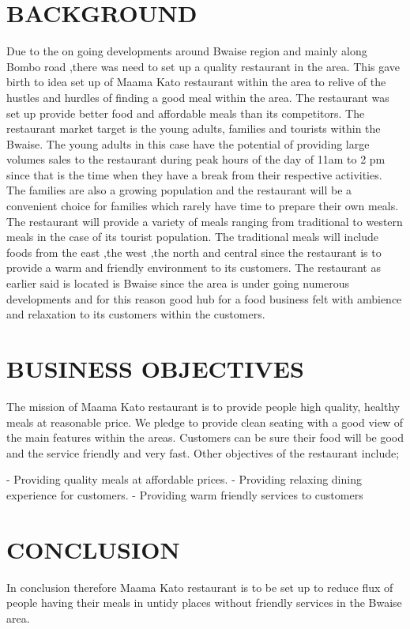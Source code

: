 \documentclass[12pt,letterpaper]{article}
\begin{document}
\section{BACKGROUND}
Due to the on going developments around Bwaise region and mainly along Bombo road ,there was need to set up a quality restaurant  in the area. This gave birth to idea set up of Maama Kato restaurant within the area to relive of the hustles and hurdles of finding a good meal within the area. The restaurant was set up provide better food and affordable meals than its competitors. The restaurant  market target is the young adults, families and tourists within the Bwaise. The young adults in this case have the potential of providing large volumes sales to the restaurant during peak hours of the day of 11am to 2 pm since that is the time when they have a break from their respective activities. The families are also a growing population and  the restaurant will be a convenient choice for families which rarely have time to prepare their own meals.
The restaurant will provide a variety of meals ranging from traditional to western  meals in the case of its tourist population. The traditional meals will include foods from  the east ,the west ,the north and central since the restaurant is to provide a warm and friendly environment to its customers.
The restaurant as earlier said is located is Bwaise since the area is under going numerous developments and for this reason good hub for a food business felt with ambience and relaxation to its customers within the customers.

\section{BUSINESS OBJECTIVES}
The mission of Maama Kato restaurant is to provide people high quality, healthy meals at reasonable price. We pledge to provide clean seating with a good view of the main features within the areas. Customers can be sure their food will be good and the service friendly and very fast. Other objectives of the restaurant include;

- Providing quality meals at affordable prices.	
- Providing relaxing dining experience for customers.
- Providing warm friendly services to customers

\section{CONCLUSION}
 In conclusion therefore Maama Kato restaurant is to be set up to reduce flux of people having their meals in untidy places without friendly services in the Bwaise area.
\end{document}
